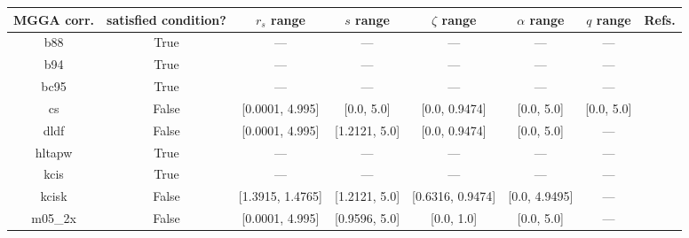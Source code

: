 \begin{tabular}{|c|c|c|c|c|c|c|l|}
\hline
    MGGA corr. &  satisfied condition? &       $r_s$ range &         $s$ range &     $\zeta$ range & $\alpha$ range &  $q$ range  &                                                                               Refs. \\ \hline
           b88 &                  True &               --- &               --- &               --- &            --- &         --- &                                                               \cite{Becke1988_1053} \\ \hline
           b94 &                  True &               --- &               --- &               --- &            --- &         --- &                                                                \cite{Becke1994_625} \\ \hline
          bc95 &                  True &               --- &               --- &               --- &            --- &         --- &                                                               \cite{Becke1996_1040} \\ \hline
            cs &                 False &   [0.0001, 4.995] &        [0.0, 5.0] &     [0.0, 0.9474] &     [0.0, 5.0] &  [0.0, 5.0] &                                                    \cite{Colle1975_329,Lee1988_785} \\ \hline
          dldf &                 False &   [0.0001, 4.995] &     [1.2121, 5.0] &     [0.0, 0.9474] &     [0.0, 5.0] &         --- &                                                            \cite{Pernal2009_263201} \\ \hline
        hltapw &                  True &               --- &               --- &               --- &            --- &         --- &                                                              \cite{Lehtola2021_943} \\ \hline
          kcis &                  True &               --- &               --- &               --- &            --- &         --- &  \cite{Rey1998_581,Krieger1999_463,Krieger2001_48,Kurth1999_889,Toulouse2002_10465} \\ \hline
         kcisk &                 False &  [1.3915, 1.4765] &     [1.2121, 5.0] &  [0.6316, 0.9474] &  [0.0, 4.9495] &         --- &  \cite{Rey1998_581,Krieger1999_463,Krieger2001_48,Kurth1999_889,Toulouse2002_10465} \\ \hline
       m05\_2x &                 False &   [0.0001, 4.995] &     [0.9596, 5.0] &        [0.0, 1.0] &     [0.0, 5.0] &         --- &                                                                 \cite{Zhao2006_364} \\ \hline

\end{tabular}
